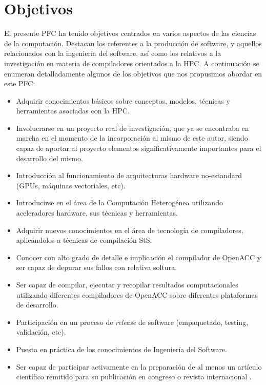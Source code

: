 %
%
%
%


\chapter{Objetivos} \label{chap:objetives}  

El presente \ac{PFC} ha tenido objetivos centrados en varios aspectos
de las ciencias de la computación. Destacan los referentes a la producción de software, y 
aquellos relacionados con la ingeniería del software, así como los relativos a la 
investigación en materia de compiladores orientados a la \acf{HPC}. A continuación se
enumeran detalladamente algunos de los objetivos que nos propusimos abordar en 
este \ac{PFC}:

\begin{itemize}
\item Adquirir conocimientos básicos sobre conceptos, modelos, técnicas y 
herramientas asociadas con la \ac{HPC}.
\item Involucrarse en un proyecto real de investigación, \accULL{} que ya se encontraba en 
marcha en el momento de la incorporación al mismo de este autor, siendo capaz de aportar 
al proyecto elementos significativamente importantes para el desarrollo del mismo.
\item Introducción al funcionamiento de arquitecturas hardware no-estandard (GPUs, 
máquinas vectoriales, etc).
\item Introducirse en el área de la Computación Heterogénea utilizando 
aceleradores hardware, sus técnicas y herramientas.
\item Adquirir nuevos conocimientos en el área de tecnología de compiladores, aplicándolos 
a técnicas de compilación \acf{StS}.
\item Conocer con alto grado de detalle e implicación el compilador de OpenACC \accULL{} y
ser capaz de depurar sus fallos con relativa soltura.
\item Ser capaz de compilar, ejecutar y recopilar resultados computacionales utilizando diferentes compiladores de OpenACC sobre diferentes plataformas de desarrollo.
\item Participación en un proceso de \textit{release} de software (empaquetado, testing, 
validación, etc).
\item Puesta en práctica de los conocimientos de Ingeniería del Software.
\item Ser capaz de participar activamente en la preparación de al menos un artículo científico remitido para su publicación en congreso o revista internacional 
\cite{Grillo:2013:PGD}.
\end{itemize}
